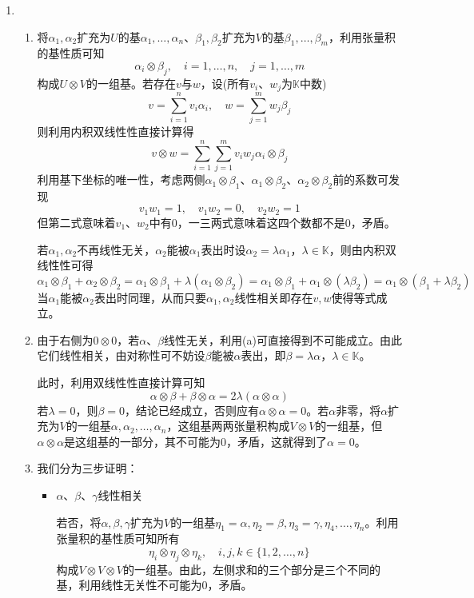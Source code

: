 \documentclass[a4paper,UTF8,fontset=windows,AutoFakeBold]{ctexart}
\begin{document}
\begin{enumerate}
    \item
    \begin{enumerate}
        \item 将$\alpha_1,\alpha_2$扩充为$U$的基$\alpha_1,\dots,\alpha_n$、$\beta_1,\beta_2$扩充为$V$的基$\beta_1,\dots,\beta_m$，利用张量积的基性质可知
        $$\alpha_i\otimes\beta_j,\quad i=1,\dots,n,\quad j=1,\dots,m$$
        构成$U\otimes V$的一组基。若存在$v$与$w$，设(所有$v_i$、$w_j$为$\mathbb{K}$中数)
        $$v=\sum_{i=1}^nv_i\alpha_i,\quad w=\sum_{j=1}^mw_j\beta_j$$
        则利用内积双线性性直接计算得
        $$v\otimes w=\sum_{i=1}^n\sum_{j=1}^mv_iw_j\alpha_i\otimes \beta_j$$
        利用基下坐标的唯一性，考虑两侧$\alpha_1\otimes\beta_1$、$\alpha_1\otimes\beta_2$、$\alpha_2\otimes\beta_2$前的系数可发现
        $$v_1w_1=1,\quad v_1w_2=0,\quad v_2w_2=1$$
        但第二式意味着$v_1$、$w_2$中有0，一三两式意味着这四个数都不是0，矛盾。

        若$\alpha_1,\alpha_2$不再线性无关，$\alpha_2$能被$\alpha_1$表出时设$\alpha_2=\lambda\alpha_1$，$\lambda\in\mathbb{K}$，则由内积双线性性可得
        $$\alpha_1\otimes\beta_1+\alpha_2\otimes\beta_2=\alpha_1\otimes\beta_1+\lambda(\alpha_1\otimes\beta_2)=\alpha_1\otimes\beta_1+\alpha_1\otimes(\lambda\beta_2)=\alpha_1\otimes(\beta_1+\lambda\beta_2)$$
        当$\alpha_1$能被$\alpha_2$表出时同理，从而只要$\alpha_1,\alpha_2$线性相关即存在$v,w$使得等式成立。

        \item
        由于右侧为$0\otimes 0$，若$\alpha$、$\beta$线性无关，利用(a)可直接得到不可能成立。由此它们线性相关，由对称性可不妨设$\beta$能被$\alpha$表出，即$\beta=\lambda\alpha$，$\lambda\in\mathbb{K}$。

        此时，利用双线性性直接计算可知
        $$\alpha\otimes\beta+\beta\otimes\alpha=2\lambda(\alpha\otimes\alpha)$$
        若$\lambda=0$，则$\beta=0$，结论已经成立，否则应有$\alpha\otimes\alpha=0$。若$\alpha$非零，将$\alpha$扩充为$V$的一组基$\alpha,\alpha_2,\dots,\alpha_n$，这组基两两张量积构成$V\otimes V$的一组基，但$\alpha\otimes\alpha$是这组基的一部分，其不可能为0，矛盾，这就得到了$\alpha=0$。

        \item
        我们分为三步证明：
        \begin{itemize}
            \item $\alpha$、$\beta$、$\gamma$线性相关
            
            若否，将$\alpha,\beta,\gamma$扩充为$V$的一组基$\eta_1=\alpha,\eta_2=\beta,\eta_3=\gamma,\eta_4,\dots,\eta_n$。利用张量积的基性质可知所有
            $$\eta_i\otimes\eta_j\otimes\eta_k,\quad i,j,k\in\{1,2,\dots,n\}$$
            构成$V\otimes V\otimes V$的一组基。由此，左侧求和的三个部分是三个不同的基，利用线性无关性不可能为0，矛盾。


\end{itemize}
\end{enumerate}
\end{enumerate}
\end{document}
